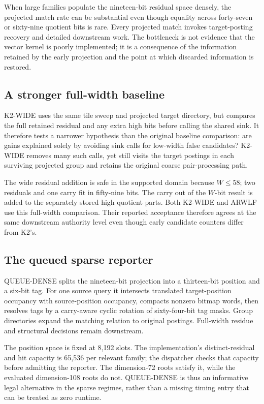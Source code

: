 \documentclass[manuscript,screen,review]{acmart}
\begin{document}
When large families populate the nineteen-bit residual space densely, the projected match rate can be substantial even though equality across forty-seven or sixty-nine quotient bits is rare. Every projected match invokes target-posting recovery and detailed downstream work. The bottleneck is not evidence that the vector kernel is poorly implemented; it is a consequence of the information retained by the early projection and the point at which discarded information is restored.

\subsection{A stronger full-width baseline}
K2-WIDE uses the same tile sweep and projected target directory, but compares the full retained residual and any extra high bits before calling the shared sink. It therefore tests a narrower hypothesis than the original baseline comparison: are gains explained solely by avoiding sink calls for low-width false candidates? K2-WIDE removes many such calls, yet still visits the target postings in each surviving projected group and retains the original coarse pair-processing path.

The wide residual addition is safe in the supported domain because $W\leq58$; two residuals and one carry fit in fifty-nine bits. The carry out of the $W$-bit result is added to the separately stored high quotient parts. Both K2-WIDE and ARWLF use this full-width comparison. Their reported acceptance therefore agrees at the same downstream authority level even though early candidate counters differ from K2's.

\subsection{The queued sparse reporter}
QUEUE-DENSE splits the nineteen-bit projection into a thirteen-bit position and a six-bit tag. For one source query it intersects translated target-position occupancy with source-position occupancy, compacts nonzero bitmap words, then resolves tags by a carry-aware cyclic rotation of sixty-four-bit tag masks. Group directories expand the matching relation to original postings. Full-width residue and structural decisions remain downstream.

The position space is fixed at 8,192 slots. The implementation's distinct-residual and hit capacity is 65,536 per relevant family; the dispatcher checks that capacity before admitting the reporter. The dimension-72 roots satisfy it, while the evaluated dimension-108 roots do not. QUEUE-DENSE is thus an informative legal alternative in the sparse regimes, rather than a missing timing entry that can be treated as zero runtime.
\end{document}

